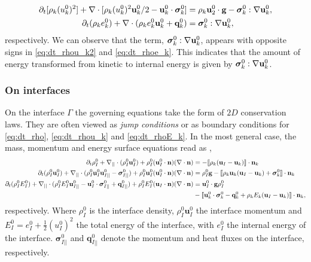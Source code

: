 \begin{align}
    \label{eq:dt_rhou_k2}
    \partial_t [\rho_k(u_k^0)^2]  
    + \mathbf{\nabla}\cdot [\rho_k(u_k^0)^2\textbf{u}_k^0/2 - \textbf{u}_k^0 \cdot \bm{\sigma}_k^0]
    &=
    \rho_k\textbf{u}_2^0 \cdot \textbf{g}  
    -  \bm{\sigma}_k^0 : \mathbf{\nabla} \textbf{u}_k^0,
    \\
    \label{eq:dt_rhoe_k}
    \partial_t (\rho_ke_k^0)  
    + \mathbf{\nabla}\cdot (
        \rho_ke_k^0\textbf{u}_k^0
        + \textbf{q}_k^0
        )
    &= 
    \bm{\sigma}_k^0 : \mathbf{\nabla} \textbf{u}_k^0,
\end{align} 
respectively. 
We can observe that the term, $\bm{\sigma}_k^0 : \mathbf{\nabla} \textbf{u}_k^0$,  appears with opposite signs in \ref{eq:dt_rhou_k2} and \ref{eq:dt_rhoe_k}.
This indicates that the amount of energy transformed from kinetic to internal energy is given by $\bm{\sigma}_k^0 : \mathbf{\nabla} \textbf{u}_k^0$.

\subsubsection{On interfaces}

On the interface $\Gamma$ the governing equations take the form of $2D$ conservation laws. 
They are often viewed as \textit{jump conditions} or as boundary conditions for  \ref{eq:dt_rho}, \ref{eq:dt_rhou_k} and \ref{eq:dt_rhoE_k}. 
In the most general case, the mass, momentum and energy surface equations read as \citep{ishii2010thermo,morel2015mathematical,bothe2022sharp}, 
\begin{align}
    \label{eq:dt_rhoI}
    \partial_t \rho_I^0
    + \mathbf{\nabla}_{||}\cdot (\rho_I^0\textbf{u}_{I}^0)
    + \rho_I^0 (\textbf{u}_I^0 \cdot \textbf{n})(\mathbf{\nabla}\cdot \textbf{n})
    &= 
    -\llbracket 
        \rho_k (\textbf{u}_I - \textbf{u}_k)
     \rrbracket \cdot \textbf{n}_k
    \\
    \label{eq:dt_rhoIu_I}
    \partial_t (\rho_I^0\textbf{u}_I^0)  
    + \mathbf{\nabla}_{||}\cdot (
        \rho_I^0\textbf{u}_{I}^0\textbf{u}_{I||}^0
        - \bm{\sigma}_{I||}^0)
        + \rho_I^0 \textbf{u}_I^0 (\textbf{u}_I^0 \cdot \textbf{n})(\mathbf{\nabla}\cdot \textbf{n})
    &= 
    \rho_I^0 \textbf{g}
    - \llbracket 
        \rho_k \textbf{u}_k (\textbf{u}_I - \textbf{u}_k)
        + \bm\sigma^0_k
     \rrbracket \cdot \textbf{n}_k
    \\
    \label{eq:dt_rhoIE_I}
    \partial_t (\rho_I^0E_I^0)  
    + \mathbf{\nabla}_{||}\cdot (
        \rho_I^0 E_I^0\textbf{u}_{I||}^0
        - \textbf{u}_I^0 \cdot \bm{\sigma}_{I||}^0 
        + \textbf{q}_{I||}^0
        )
    + \rho_I^0E_I^0  (\textbf{u}_I \cdot \textbf{n})(\mathbf{\nabla}\cdot \textbf{n})
    &= 
    \textbf{u}_I^0 \cdot \textbf{g}  \rho_I^0 \nonumber\\
    &- \llbracket \textbf{u}_k^0 \cdot \bm{\sigma}_k^0 - \textbf{q}_k^0
    + \rho_k E_k (\textbf{u}_I - \textbf{u}_k)
     \rrbracket \cdot \textbf{n}_k,
\end{align} 
respectively.
Where $\rho_I^0$ is the interface density, $\rho_I^0\textbf{u}_I^0$ the interface momentum 
and $E_I^0 = e_I^0 + \frac{1}{2}(u_I^0)^2$ the total energy of the interface, with $e_I^0$ the internal energy of the interface.
$\bm{\sigma}_{I||}^0$ and $\textbf{q}_{I||}^0$ denote the momentum and heat fluxes on the interface, respectively.


